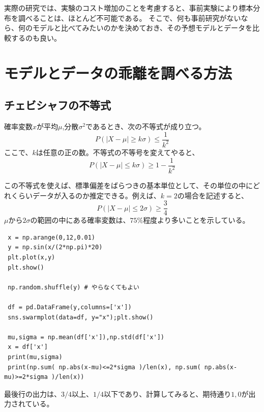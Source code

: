 実際の研究では、実験のコスト増加のことを考慮すると、事前実験により標本分布を調べることは、ほとんど不可能である。
そこで、何も事前研究がないなら、何のモデルと比べてみたいのかを決めておき、その予想モデルとデータを比較するのも良い。
\fi




\section{モデルとデータの乖離を調べる方法}

\subsection{チェビシャフの不等式}
\begin{lemm}
 確率変数$x$が平均$\mu$,分散$\sigma^2$であるとき、次の不等式が成り立つ。
 \begin{equation*}
  P(|X-\mu| \geq k\sigma) \leq \frac{1}{k^2}
 \end{equation*}
ここで、$k$は任意の正の数。不等式の不等号を変えてやると、
 \begin{equation*}
  P(|X-\mu| \leq k\sigma) \geq 1-\frac{1}{k^2}
 \end{equation*}
\end{lemm}
この不等式を使えば、標準偏差をばらつきの基本単位として、その単位の中にどれくらいデータが入るのか推定できる。例えば、$k=2$の場合を記述すると、
 \begin{equation*}
  P(|X-\mu| \leq 2\sigma) \geq \frac{3}{4}
 \end{equation*}
$\mu$から$2\sigma$の範囲の中にある確率変数は、$75\%$程度より多いことを示している。
\begin{lstlisting}
 x = np.arange(0,12,0.01)
 y = np.sin(x/(2*np.pi)*20)
 plt.plot(x,y)
 plt.show()

 np.random.shuffle(y) # やらなくてもよい

 df = pd.DataFrame(y,columns=['x'])
 sns.swarmplot(data=df, y="x");plt.show()

 mu,sigma = np.mean(df['x']),np.std(df['x'])
 x = df['x']
 print(mu,sigma)
 print(np.sum( np.abs(x-mu)<=2*sigma )/len(x), np.sum( np.abs(x-mu)>=2*sigma )/len(x))
\end{lstlisting}
最後行の出力は、$3/4$以上、$1/4$以下であり、計算してみると、期待通り$1,0$が出力されている。




